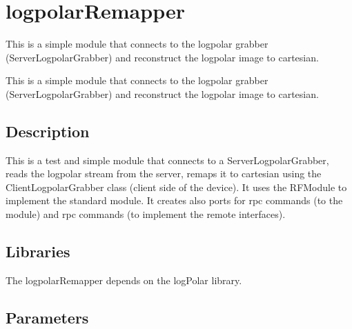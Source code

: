 \section{logpolar\+Remapper}
\label{group__icub__logpolarRemapper}


This is a simple module that connects to the logpolar grabber (Server\+Logpolar\+Grabber) and reconstruct the logpolar image to cartesian.  


This is a simple module that connects to the logpolar grabber (Server\+Logpolar\+Grabber) and reconstruct the logpolar image to cartesian. 

\hypertarget{group__icub__logpolarRemapper_intro_sec}{}\subsection{Description}\label{group__icub__logpolarRemapper_intro_sec}
This is a test and simple module that connects to a Server\+Logpolar\+Grabber, reads the logpolar stream from the server, remaps it to cartesian using the Client\+Logpolar\+Grabber class (client side of the device). It uses the R\+F\+Module to implement the standard module. It creates also ports for rpc commands (to the module) and rpc commands (to implement the remote interfaces).\hypertarget{group__icub__logpolarTransform_lib_sec}{}\subsection{Libraries}\label{group__icub__logpolarTransform_lib_sec}
The logpolar\+Remapper depends on the log\+Polar library.\hypertarget{group__icub__logpolarTransform_parameters_sec}{}\subsection{Parameters}\label{group__icub__logpolarTransform_parameters_sec}

